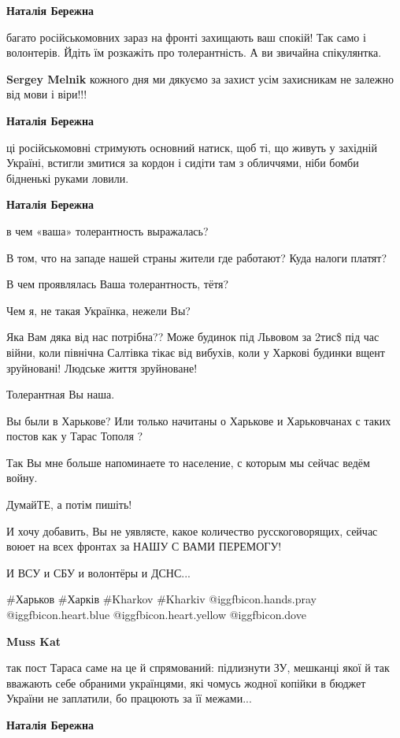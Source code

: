 \begin{itemize}
\begin{itemize}
\textbf{Наталія Бережна} 

багато російськомовних зараз на фронті захищають ваш спокій! Так само і
волонтерів. Йдіть їм розкажіть про толерантність. А ви звичайна спікулянтка.

\textbf{Sergey Melnik} кожного дня ми дякуємо за захист усім захисникам не залежно від мови і віри!!!

\textbf{Наталія Бережна} 

ці російськомовні стримують основний натиск, щоб ті, що живуть у західній
Україні, встигли змитися за кордон і сидіти там з обличчями, ніби бомби
бідненькі руками ловили.

\textbf{Наталія Бережна} 

в чем «ваша» толерантность выражалась?

В том, что на западе нашей страны жители где работают? Куда налоги платят?

В чем проявлялась Ваша толерантность, тётя?

Чем я, не такая Українка, нежели Вы?

Яка Вам дяка від нас потрібна?? Може будинок під Львовом за 2тис\$ під час
війни, коли північна Салтівка тікає від вибухів, коли у Харкові будинки вщент
зруйновані! Людське життя зруйноване!

Толерантная Вы наша.

Вы были в Харькове? Или только начитаны о Харькове и Харьковчанах с таких
постов как у Тарас Тополя ?

Так Вы мне больше напоминаете то население, с которым мы сейчас ведём войну.

ДумайТЕ, а потім пишіть!

И хочу добавить, Вы не уявляєте, какое количество русскоговорящих, сейчас воюет
на всех фронтах за НАШУ С ВАМИ ПЕРЕМОГУ!

И ВСУ и СБУ и волонтёры и ДСНС...

\#Харьков \#Харків \#Kharkov \#Kharkiv  @igg{fbicon.hands.pray}
@igg{fbicon.heart.blue}  @igg{fbicon.heart.yellow}  @igg{fbicon.dove} 

\textbf{Muss Kat} 

так пост Тараса саме на це й спрямований: підлизнути ЗУ, мешканці якої й так
вважають себе обраними українцями, які чомусь жодної копійки в бюджет України
не заплатили, бо працюють за її межами...

\textbf{Наталія Бережна} 


\end{itemize}
\end{itemize}

